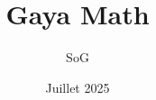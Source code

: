 \documentclass[a4paper,12pt,oneside]{book}
\begin{document}
	
	\author{SoG}
	\title{Gaya Math}
	\date{Juillet 2025}
	
	\frontmatter
	\maketitle
	
 	   \dominitoc 
 	   \setcounter{tocdepth}{0 }
 	   \tableofcontents  
 	   \setcounter{secnumdepth}{3}
 	   
 	  
	\label{sec:sommaire}              
	
	\mainmatter

          
	  
	
	\backmatter
	
    
\end{document}
